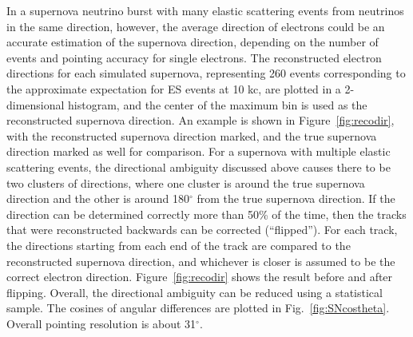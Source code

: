 In a supernova neutrino burst with many elastic scattering events from neutrinos in the same direction, however, the average direction of electrons could be an accurate estimation of the supernova direction, depending on the number of events and pointing accuracy for single electrons.
The reconstructed electron directions for each simulated supernova,
representing 260 events corresponding to the approximate expectation
for ES events at 10 kc, are plotted in a 2-dimensional histogram, and
the center of the maximum bin is used as the reconstructed supernova
direction. An example is shown in Figure~\ref{fig:recodir}, with the
reconstructed supernova direction marked, and the true supernova
direction marked as well for comparison.
For a supernova with multiple elastic scattering events, the
directional ambiguity discussed above causes there to be two clusters
of directions, where one cluster is around the true supernova
direction and the other is around 180$^{\circ}$ from the true
supernova direction.
If the direction can be determined correctly more than 50\% of the
time, then the tracks that were reconstructed backwards can be
corrected (``flipped''). For each track, the directions starting from
each end of the track are compared to the reconstructed supernova
direction, and whichever is closer is assumed to be the correct
electron direction.  Figure~\ref{fig:recodir} shows the result before
and after flipping.
Overall, the directional
ambiguity can be reduced using a statistical sample.
The cosines of angular differences are plotted in
Fig.~\ref{fig:SNcostheta}.    Overall pointing resolution is about 31$^\circ$.



